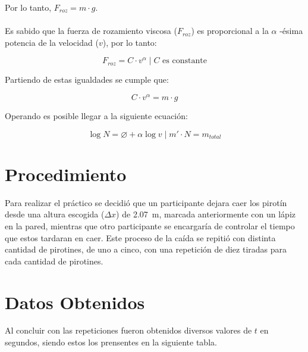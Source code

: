 \documentclass{article}
\begin{document}
Por lo tanto, $F_{roz}=m\cdot g$.
\\
\\
Es sabido que la fuerza de rozamiento viscosa ($F_{roz}$) es proporcional a la $\alpha$ -ésima potencia de la velocidad ($v$), por lo tanto:

$$F_{roz}=C\cdot v^\alpha \mid C \text{ es constante}$$

Partiendo de estas igualdades se cumple que:

$$C\cdot v^\alpha=m\cdot g$$

Operando es posible llegar a la siguiente ecuación:

\begin{equation}
\label{eqn:alpha}
\log N= \varnothing +\alpha \log v \mid m'\cdot N = m_{total}
\end{equation}

\section{Procedimiento}
Para realizar el práctico se decidió que un participante dejara caer los pirotín desde una altura escogida ($\Delta x$) de \qty[mode = text] {2,07} {m}, marcada anteriormente con un lápiz en la pared, mientras que otro participante se encargaría de controlar el tiempo que estos tardaran en caer. Este proceso de la caída se repitió con distinta cantidad de pirotines, de uno a cinco, con una repetición de diez tiradas para cada cantidad de pirotines.
\pagebreak

\section{Datos Obtenidos}
Al concluir con las repeticiones fueron obtenidos diversos valores de $t$ en segundos, siendo estos los prensentes en la siguiente tabla.
\end{document}
